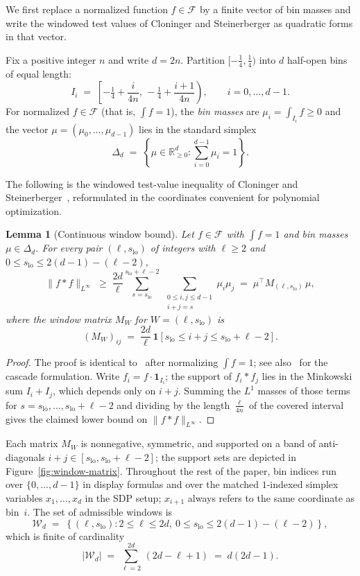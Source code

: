 \documentclass[11pt, letterpaper]{article}
\theoremstyle{paperplain}
\newtheorem{lemma}[theorem]{Lemma}
\theoremstyle{paperdef}
\newcommand{\R}{\mathbb{R}}
\begin{document}
We first replace a normalized function $f\in\mathcal{F}$ by a finite
vector of bin masses and write the windowed test values of Cloninger
and Steinerberger as quadratic forms in that vector.

Fix a positive integer $n$ and write $d=2n$.  Partition
$[-\tfrac14,\tfrac14)$ into $d$ half-open bins of equal length:
\[
  I_i
  \;=\;
  \left[-\tfrac14 + \frac{i}{4n},\,
        -\tfrac14 + \frac{i+1}{4n}\right),
  \qquad i=0,\dots,d-1.
\]
For normalized $f\in\mathcal{F}$ (that is, $\int f=1$), the
\emph{bin masses} are $\mu_i = \int_{I_i} f \ge 0$ and the vector
$\mu=(\mu_0,\ldots,\mu_{d-1})$ lies in the standard simplex
\[
  \Delta_d \;=\; \left\{\mu \in \R_{\ge 0}^d : \sum_{i=0}^{d-1}\mu_i = 1\right\}.
\]

The following is the windowed test-value inequality of Cloninger and
Steinerberger~\cite[Lemma~1]{CS17}, reformulated in the coordinates
convenient for polynomial optimization.

\begin{lemma}[Continuous window bound]
\label{lem:continuous-window}
Let $f\in\mathcal{F}$ with $\int f=1$ and bin masses
$\mu\in\Delta_d$.  For every pair $(\ell,s_{\mathrm{lo}})$ of
integers with $\ell\ge 2$ and $0\le s_{\mathrm{lo}}\le 2(d-1)-(\ell-2)$,
\[
  \|f*f\|_{L^\infty}
  \;\ge\;
  \frac{2d}{\ell}
  \sum_{s=s_{\mathrm{lo}}}^{s_{\mathrm{lo}}+\ell-2}
  \ \sum_{\substack{0\le i,j\le d-1\\ i+j=s}}
  \mu_i\mu_j
  \;=\;
  \mu^\top M_{(\ell,s_{\mathrm{lo}})}\, \mu,
\]
where the window matrix $M_W$ for $W=(\ell,s_{\mathrm{lo}})$ is
\[
  (M_W)_{ij}
  \;=\;
  \frac{2d}{\ell}\,
  \mathbf{1}\!\left[s_{\mathrm{lo}}\le i+j\le s_{\mathrm{lo}}+\ell-2\right].
\]
\end{lemma}

\begin{proof}
The proof is identical to~\cite[Lemma~1]{CS17} after normalizing
$\int f = 1$; see also~\cite[Lemma~2.3]{BajajCS2026} for the
cascade formulation.  Write $f_i=f\cdot\mathbf{1}_{I_i}$; the support of $f_i*f_j$ lies in the
Minkowski sum $I_i+I_j$, which depends only on $i+j$.  Summing the
$L^1$ masses of those terms for $s=s_{\mathrm{lo}},\ldots,s_{\mathrm{lo}}+\ell-2$
and dividing by the length $\tfrac{\ell}{4n}$ of the covered interval
gives the claimed lower bound on $\|f*f\|_{L^\infty}$.
\end{proof}

Each matrix $M_W$ is nonnegative, symmetric, and supported on a band
of anti-diagonals $i+j\in[s_{\mathrm{lo}},s_{\mathrm{lo}}+\ell-2]$; the
support sets are depicted in Figure~\ref{fig:window-matrix}.
Throughout the rest of the paper, bin indices run over
$\{0,\ldots,d-1\}$ in display formulas and over the matched
$1$-indexed simplex variables $x_1,\ldots,x_d$ in the SDP setup;
$x_{i+1}$ always refers to the same coordinate as bin~$i$.  The set of
admissible windows is
\[
  \mathcal{W}_d
  \;=\;
  \left\{
    (\ell,s_{\mathrm{lo}}):
    2\le \ell\le 2d,\
    0\le s_{\mathrm{lo}}\le 2(d-1)-(\ell-2)
  \right\},
\]
which is finite of cardinality
\[
  |\mathcal{W}_d|
  \;=\;
  \sum_{\ell=2}^{2d}\,(2d-\ell+1)
  \;=\;
  d(2d-1).
\]
\end{document}
